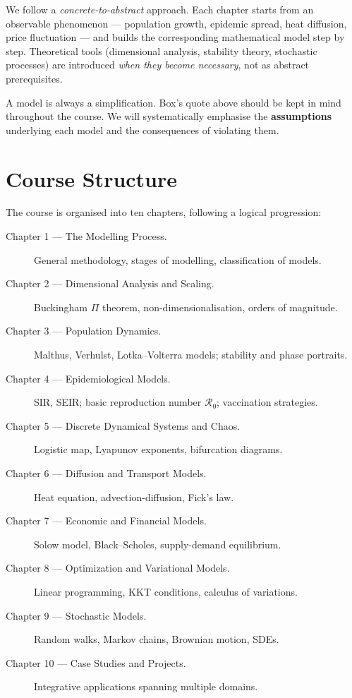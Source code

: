 We follow a \emph{concrete-to-abstract} approach.  Each chapter starts from
an observable phenomenon --- population growth, epidemic spread, heat
diffusion, price fluctuation --- and builds the corresponding mathematical
model step by step.  Theoretical tools (dimensional analysis, stability
theory, stochastic processes) are introduced \emph{when they become
necessary}, not as abstract prerequisites.

\begin{warning}[title=\textbf{Model $\neq$ Reality}]
A model is always a simplification.  Box's quote above should be kept in
mind throughout the course.  We will systematically emphasise the
\textbf{assumptions} underlying each model and the consequences of
violating them.
\end{warning}

\section*{Course Structure}

The course is organised into ten chapters, following a logical progression:

\begin{description}
  \item[Chapter 1 --- The Modelling Process.]
    General methodology, stages of modelling, classification of models.
  \item[Chapter 2 --- Dimensional Analysis and Scaling.]
    Buckingham $\Pi$ theorem, non-dimensionalisation, orders of magnitude.
  \item[Chapter 3 --- Population Dynamics.]
    Malthus, Verhulst, Lotka--Volterra models; stability and phase portraits.
  \item[Chapter 4 --- Epidemiological Models.]
    SIR, SEIR; basic reproduction number $\mathcal{R}_0$; vaccination
    strategies.
  \item[Chapter 5 --- Discrete Dynamical Systems and Chaos.]
    Logistic map, Lyapunov exponents, bifurcation diagrams.
  \item[Chapter 6 --- Diffusion and Transport Models.]
    Heat equation, advection-diffusion, Fick's law.
  \item[Chapter 7 --- Economic and Financial Models.]
    Solow model, Black--Scholes, supply-demand equilibrium.
  \item[Chapter 8 --- Optimization and Variational Models.]
    Linear programming, KKT conditions, calculus of variations.
  \item[Chapter 9 --- Stochastic Models.]
    Random walks, Markov chains, Brownian motion, SDEs.
  \item[Chapter 10 --- Case Studies and Projects.]
    Integrative applications spanning multiple domains.
\end{description}

